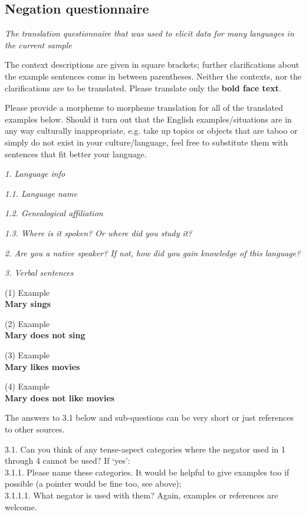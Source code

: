 \documentclass[output=paper,colorlinks,citecolor=brown]{langscibook}
\begin{document}
\begin{paperappendix}
\section{Negation questionnaire}

\textit{The translation questionnaire that was used to elicit data for many
languages in the current sample}


\begin{unindented}
The context descriptions are given in square brackets; further clarifications about the example sentences come in between parentheses. Neither the contexts, nor the clarifications are to be translated. Please translate only the \textbf{bold face text}.

Please provide a morpheme to morpheme translation for all of the translated examples below. Should it turn out that the English examples/situations are in any way culturally inappropriate, e.g. take up topics or objects that are taboo or simply do not exist in your culture/language, feel free to substitute them with sentences that fit better your language. 

\textit{1. Language info}

\textit{1.1. Language name}

\textit{1.2. Genealogical affiliation}

\textit{1.3. Where is it spoken? Or where did you study it?}

\textit{2. Are you a native speaker? If not, how did you gain knowledge of
this language?}

\textit{3. Verbal sentences} 

(1) Example \\
\textbf{Mary sings}

(2) Example \\
\textbf{Mary does not sing}

(3) Example \\
\textbf{Mary likes movies}

(4) Example \\
\textbf{Mary does not like movies}

The answers to 3.1 below and sub-questions can be very short or just
references to other sources. 

3.1. Can you think of any tense-aspect categories where the negator used
in 1 through 4 cannot be used? If `yes':\\
3.1.1. Please name these categories. It would be helpful to give examples
too if possible (a pointer would be fine too, see above); \\
3.1.1.1. What negator is used with them? Again, examples or references are
welcome. 


\end{unindented}
\end{paperappendix}
\end{document}
